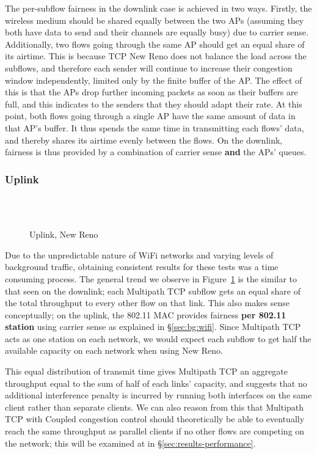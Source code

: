 The per-subflow fairness in the downlink case is achieved in two ways. Firstly,
the wireless medium should be shared equally between the two APs (assuming they
both have data to send and their channels are equally busy) due to carrier
sense. Additionally, two flows going through the same AP should get an equal
share of its airtime. This is because TCP New Reno does not balance the load
across the subflows, and therefore each sender will continue to increase their
congestion window independently, limited only by the finite buffer of the AP.\@
The effect of this is that the APs drop further incoming packets as soon as
their buffers are full, and this indicates to the senders that they should adapt
their rate. At this point, both flows going through a single AP have the same
amount of data in that AP's buffer. It thus spends the same time in transmitting
each flows' data, and thereby shares its airtime evenly between the flows. On
the downlink, fairness is thus provided by a combination of carrier sense
\textbf{and} the APs' queues.

\subsubsection{Uplink}
\label{sec:results-mptcp-up}

\begin{figure}[h]
  \centering
  \\
  \subfloat[][2.4 GHz, non-overlapping channels] {\
    \scalebox{0.70}{}\label{graph:cc-reno-up}
  }
  \\
  \subfloat[][5 and 2.4 GHz] {\
    \scalebox{0.70}{}\label{graph:cb-reno-up}
  }
  \caption{Uplink, New Reno}\label{graph:reno-up}
\end{figure}

Due to the unpredictable nature of WiFi networks and varying levels of
background traffic, obtaining consistent results for these tests was a time
consuming process. The general trend we observe in Figure~\ref{graph:reno-up} is
the similar to that seen on the downlink; each Multipath TCP subflow gets an
equal share of the total throughput to every other flow on that link. This also
makes sense conceptually; on the uplink, the 802.11 MAC provides fairness
\textbf{per 802.11 station} using carrier sense as explained in
\S\ref{sec:bg:wifi}. Since Multipath TCP acts as one station on each network, we
would expect each subflow to get half the available capacity on each network
when using New Reno.

This equal distribution of transmit time gives Multipath TCP an aggregate
throughput equal to the sum of half of each links' capacity, and suggests that
no additional interference penalty is incurred by running both interfaces on the
same client rather than separate clients. We can also reason from this that
Multipath TCP with Coupled congestion control should theoretically be able to
eventually reach the same throughput as parallel clients if no other flows are
competing on the network; this will be examined at in
\S\ref{sec:results-performance}.

